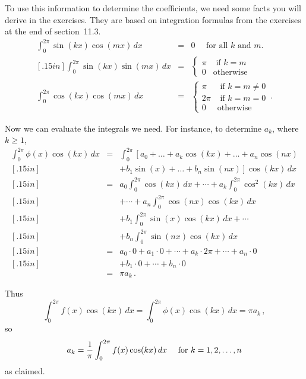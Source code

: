 {{{{To use this information to determine the coefficients, 
we need some facts you will derive in the exercises.  They are based on integration formulas from the exercises at the end of section~11.3.
\begin{eqnarray*}
\int_0^{2\pi}\sin(kx)\cos(mx)\, dx & = & 0 \quad \mbox{ for all $k$ and $m$.} \\ [.15in]
\int_0^{2\pi}\sin(kx)\sin(mx)\, dx & = &\left\{ \begin{array}{ll}
						\pi & \mbox{ if $k=m$} \\
						0   & \mbox {otherwise}
						\end{array}
					\right. \\
\int_0^{2\pi}\cos(kx)\cos(mx)\, dx & = &\left\{ \begin{array}{ll}
						\pi & \mbox{ if $k=m\ne 0$} \\
						2\pi & \mbox{ if $k=m=0$} \\
						0   & \mbox {otherwise}
						\end{array}
					\right. \, .
\end{eqnarray*}

Now we can evaluate the integrals we need.  For instance, to determine $a_k$, where $k\geq 1$,
\begin{eqnarray*}
\int_0^{2\pi}\phi(x)\cos(kx)\, dx & = & \int_0^{2\pi}\left[ a_0+\ldots +a_k\cos(kx) +\ldots+a_n\cos(nx) \right. \\ [.15in]
& &\left. +b_1\sin(x) + \ldots + b_n\sin(nx)\right]\cos(kx)\, dx \\ [.15in]
&=&a_0\int_0^{2\pi}\cos(kx)\, dx+\cdots+a_k\int_0^{2\pi}\cos^2(kx)\, dx\\ [.15in] & &+\cdots+a_n\int_0^{2\pi}\cos(nx)\cos(kx)\, dx	\\ [.15in]
& &+b_1\int_0^{2\pi}\sin(x)\cos(kx)\, dx +\cdots \\ [.15in]
& &+b_n\int_0^{2\pi}\sin(nx)\cos(kx)\, dx	\\ [.15in]
&=&a_0\cdot 0 +a_1\cdot 0 +\cdots +a_k\cdot 2\pi +\cdots + a_n\cdot 0 \\ [.15in]
& &+b_1\cdot 0 + \cdots +b_n\cdot 0 \\
&=&\pi a_k \, .
\end{eqnarray*}

Thus	
\[
\int_0^{2\pi}f(x)\cos(kx) \, dx = \int_0^{2\pi}\phi(x)\cos(kx)\, dx =	\pi a_k \, ,
\]
so
\[
a_k = {1 \over \pi}\int_0^{2\pi}f(x)\cos(kx) \, dx \quad \mbox{ for $k=1,2,\ldots,n$}
\]
as claimed.

}}}}
